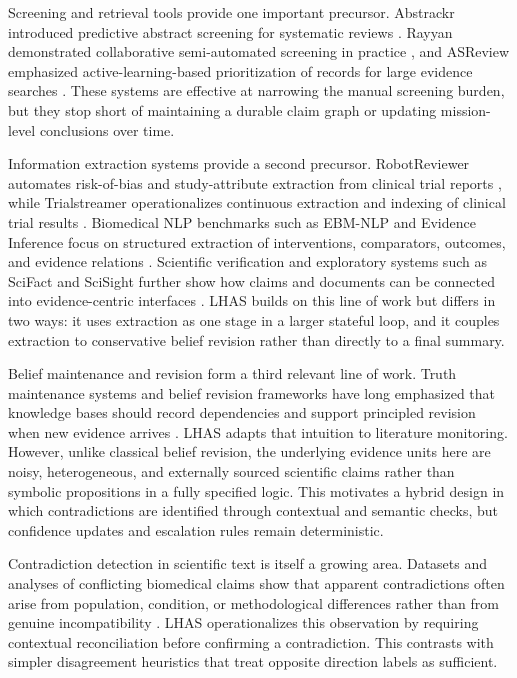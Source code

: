 \documentclass[manuscript,screen,review]{jair}
\begin{document}
Screening and retrieval tools provide one important precursor. Abstrackr introduced predictive abstract screening for systematic reviews \citep{Wallace2012}. Rayyan demonstrated collaborative semi-automated screening in practice \citep{Ouzzani2016}, and ASReview emphasized active-learning-based prioritization of records for large evidence searches \citep{vanDeSchoot2021}. These systems are effective at narrowing the manual screening burden, but they stop short of maintaining a durable claim graph or updating mission-level conclusions over time.

Information extraction systems provide a second precursor. RobotReviewer automates risk-of-bias and study-attribute extraction from clinical trial reports \citep{Marshall2016}, while Trialstreamer operationalizes continuous extraction and indexing of clinical trial results \citep{Marshall2020}. Biomedical NLP benchmarks such as EBM-NLP and Evidence Inference focus on structured extraction of interventions, comparators, outcomes, and evidence relations \citep{Nye2018,DeYoung2020}. Scientific verification and exploratory systems such as SciFact and SciSight further show how claims and documents can be connected into evidence-centric interfaces \citep{Wadden2020,Hope2020}. LHAS builds on this line of work but differs in two ways: it uses extraction as one stage in a larger stateful loop, and it couples extraction to conservative belief revision rather than directly to a final summary.

Belief maintenance and revision form a third relevant line of work. Truth maintenance systems and belief revision frameworks have long emphasized that knowledge bases should record dependencies and support principled revision when new evidence arrives \citep{Doyle1979,AGM1985,KatsunoMendelzon1992}. LHAS adapts that intuition to literature monitoring. However, unlike classical belief revision, the underlying evidence units here are noisy, heterogeneous, and externally sourced scientific claims rather than symbolic propositions in a fully specified logic. This motivates a hybrid design in which contradictions are identified through contextual and semantic checks, but confidence updates and escalation rules remain deterministic.

Contradiction detection in scientific text is itself a growing area. Datasets and analyses of conflicting biomedical claims show that apparent contradictions often arise from population, condition, or methodological differences rather than from genuine incompatibility \citep{AlamriStevenson2016}. LHAS operationalizes this observation by requiring contextual reconciliation before confirming a contradiction. This contrasts with simpler disagreement heuristics that treat opposite direction labels as sufficient.
\end{document}

